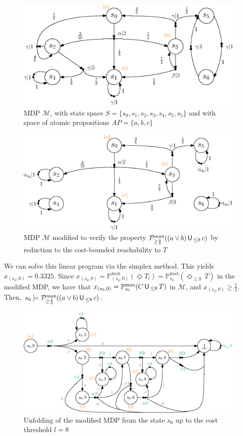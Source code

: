 \begin{example}
\begin{align*}
\end{align*}
\begin{figure}[h]
  \centering
  \includegraphics[width=0.7\linewidth]{resources/MDPExample}
  \captionsetup{justification=centering}
  \caption{MDP $\mathcal{M}$, with state space $S=\{s_0, s_1, s_2, s_3, s_4, s_5, s_5\}$ and with space of atomic propositions $AP = \{a, b, c\}$}
  \label{cost-bounded-until1}
\end{figure}
\begin{figure}[h]
  \centering
  \includegraphics[width=0.7\linewidth]{resources/MDPExample2}
  \captionsetup{justification=centering}
  \caption{MDP $\mathcal{M}$ modified to verify the property $\mathcal{P}^{\max}_{\geq \frac{1}{5}}((a \vee b) \,\text{\sffamily U}\,_{\leq 8} \, c)$ by reduction to the cost-bounded reachability to $T$}
  \label{cost-bounded-until2}
\end{figure}
We can solve this linear program via the simplex method. This yields ${x_{(s_0, 0)}=0.3325}$. Since $x_{(s_0, 0)} = \mathbb{P}_{(s_0, 0)}^{\max}(\Diamond T_l) = \mathbb{P}^{\max}_{s_0} (\Diamond_{\leq 8}\, T)$ in the modified MDP, we have that $x_{(s_0, 0)} = \mathbb{P}^{\max}_{s_0}(C \,\text{\sffamily U}\,_{\leq 8} \, T)$ in
$\mathcal{M}$, and $x_{(s_0, 0)} \geq \frac{1}{5}$. Then, $s_0 \models \mathcal{P}_{\geq \frac{1}{5}}^{\max}((a \vee b) \,\text{\sffamily U}\,_{\leq 8}\, c)$.
\begin{figure}[H]
  \centering
  \includegraphics[width=0.9\linewidth]{resources/MDPExample-unfolded}
  \captionsetup{justification=centering}
  \caption{Unfolding of the modified MDP from the state $s_0$ up to the cost threshold $l=8$}
  \label{cost-bounded-until3}
\end{figure}
\end{example}

